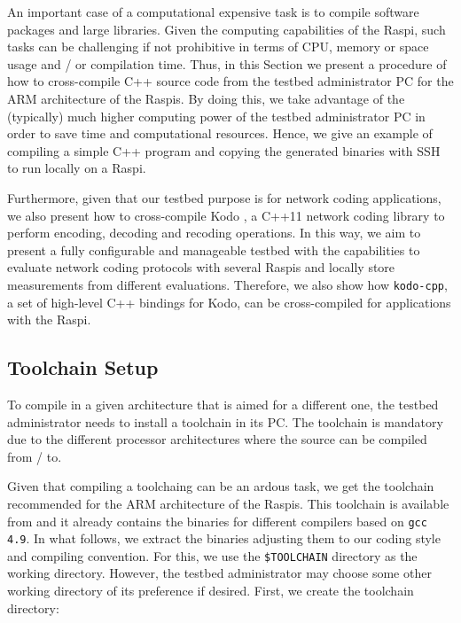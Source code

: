\label{sec:cross_compilation}
An important case of a computational expensive task is to compile software
packages and large libraries. Given the computing capabilities of the
\ac{Raspi}, such tasks can be challenging if not prohibitive in terms of
\ac{CPU}, memory or space usage and / or compilation time. Thus, in
this Section we present a procedure of how to cross-compile C++
source code from the testbed administrator \ac{PC} for the \ac{ARM}
architecture of the \ac{Raspi}s. By doing this, we take advantage
of the (typically) much higher computing power of the testbed
administrator \ac{PC} in order to save time and computational resources.
Hence, we give an example of compiling a simple C++ program and
copying the generated binaries with \ac{SSH} to run locally
on a \ac{Raspi}.

Furthermore, given that our testbed purpose is for
network coding applications, we also present how to cross-compile Kodo
\cite{kodo2011pedersen}, a C++11 network coding library to perform
encoding, decoding and recoding operations. In this way, we aim to present
a fully configurable and manageable testbed with the capabilities to
evaluate network coding protocols with several \ac{Raspi}s and locally
store measurements from different evaluations. Therefore, we also show
how \texttt{kodo-cpp}, a set of high-level C++ bindings for Kodo, can be
cross-compiled for applications with the \ac{Raspi}.

\subsection{Toolchain Setup}
To compile in a given architecture that is aimed for a different one,
the testbed administrator needs to install a toolchain in its \ac{PC}.
The toolchain is mandatory due to the different processor architectures
where the source can be compiled from / to.

Given that compiling a toolchaing can be an ardous task, we get the toolchain
recommended for the \ac{ARM} architecture of the \ac{Raspi}s.
This toolchain is available from \cite{2016rpitoolchain} and
it already contains the binaries for different compilers based on
\texttt{gcc 4.9}. In what follows, we extract the binaries adjusting
them to our coding style and compiling convention. For this, we use the
\texttt{\$TOOLCHAIN} directory as the working directory. However,
the testbed administrator may choose some other working directory of
its preference if desired. First, we create the toolchain directory:


